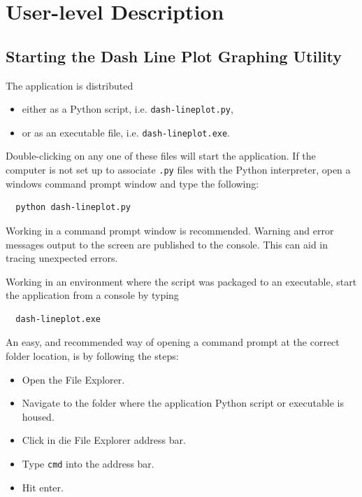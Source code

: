 

\chapter{User-level Description}

\label{chap:userLevelDescription}
\section{Starting the Dash Line Plot Graphing Utility}


The application is distributed

\begin{itemize}
  \item either as a Python script, i.e. \texttt{dash-lineplot.py},
  \item or as an executable file, i.e. \texttt{dash-lineplot.exe}.
\end{itemize}

Double-clicking on any one of these files will start the application.
If the computer is not set up to associate \texttt{.py} files with the Python interpreter, open a windows command prompt window and type the following:

\footnotesize
\begin{lstlisting}
  python dash-lineplot.py
\end{lstlisting}
\normalsize

Working in a command prompt window is recommended. Warning and error messages output to the screen are published to the console. This can aid in tracing unexpected errors.

Working in an environment where the script was packaged to an executable, start the application from a console by typing

\footnotesize
\begin{lstlisting}
  dash-lineplot.exe
\end{lstlisting}
\normalsize

An easy, and recommended way of opening a command prompt at the correct folder location, is by following the steps:

\begin{itemize}
  \item Open the File Explorer.
  \item Navigate to the folder where the application Python script or executable is housed.
  \item Click in die File Explorer address bar.
  \item Type \texttt{cmd} into the address bar.
  \item Hit enter.
\end{itemize}

